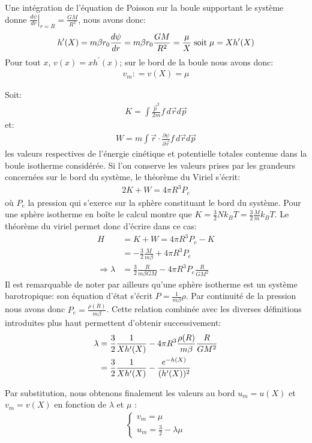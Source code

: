 	Une intégration de l'équation de Poisson sur la boule supportant le système donne $\left.\frac{d \psi}{dr}
	\right|_{r=R}= \frac{GM}{R^2}$, nous avons donc:
	\begin{align*}
		h'(X) = m\beta r_0 \frac{d \psi}{dr} = m\beta r_0 \frac{GM}{R^2} = \frac{\mu}{X} \;\textrm{soit}\; \mu = Xh'(X)
	\end{align*}
	Pour tout $x$, $v(x)=xh^{\prime}(x)$; sur le bord de la boule nous avons donc:
	\begin{align}
		 v_m: = v\left(X\right) = \mu\label{vmmu}
	\end{align}

	Soit:
	\begin{align*}K=\int \frac{\vec{p}^2}{2m}f\, d\vec{r}d\vec{p}\end{align*}
		et:
	\begin{align*}W=m\int \vec{r}\cdot \frac{\partial \psi}{\partial \vec{r}}f\, d\vec{r}d\vec{p}\end{align*}
	les valeurs respectives de l'énergie cinétique et potentielle totales contenue dans la boule isotherme considérée. Si l'on conserve les valeurs prises par les grandeurs concernées sur le bord du système, le théorème du Viriel  s'écrit:
	\begin{align}
		2K + W = 4\pi R^3 P_e \label{virielinabox}
	\end{align}
	 où $P_e$ la pression qui s'exerce sur la sphère constituant le bord du système.
	Pour une sphère isotherme en boîte  le calcul montre que \mbox{$K = \frac{3}{2} N k_B T = \frac{3}{2} \frac{M}{m} k_B T$}. Le théorème du
	viriel permet donc d'écrire dans ce cas:
	\begin{align*}
		H &= K + W =  4\pi R^3 P_e - K \\
		  &= -\frac{3}{2} \frac{M}{m\beta} + 4\pi R^3 P_e \\
		\Rightarrow \lambda &= \frac{3}{2}\frac{R}{m\beta GM} - 4\pi R^3 P_e \frac{R}{GM^2}
	\end{align*}
	Il est remarquable de noter par ailleurs qu'une sphère isotherme est un système barotropique: son équation d'état s'écrit
	$P=\frac{1}{m\beta}\rho$. Par continuité de la pression nous avons donc $P_e = \frac{\rho(R)}{m\beta}$. Cette relation combinée avec les
	diverses définitions introduites plus haut permettent d'obtenir successivement:
	\begin{align}
		\lambda &= \frac{3}{2}\frac{1}{Xh'(X)} - 4\pi R^3 \frac{\rho(R)}{m\beta} \frac{R}{GM^2} \notag \\
			&= \frac{3}{2}\frac{1}{Xh'(X)} - \frac{e^{-h(X)}}{(h'(X))^2}\label{lamum}
	\end{align}

	Par substitution, nous obtenons finalement les valeurs au bord $u_m=u(X)$ et $v_m=v(X)$ en fonction de $\lambda$ et $\mu$ :
	\begin{align}
		\label{uv_max}
		\left\{\begin{array}{l}
			v_m = \mu \\
			u_m = \frac{3}{2} - \lambda \mu
		\end{array}\right.
	\end{align}

